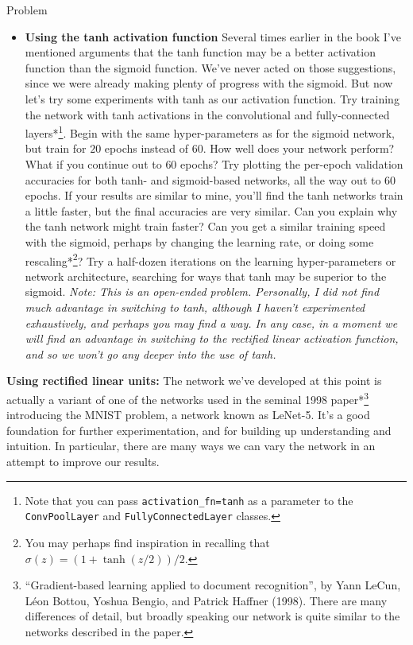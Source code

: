 \begin{exerciseBox}{Problem}


\begin{itemize}

\item \textbf{Using the tanh activation function} Several times earlier in the book I've mentioned arguments that the tanh function may be a better activation function than the sigmoid function. We've never acted on those suggestions, since we were already making plenty of progress with the sigmoid. But now let's try some experiments with tanh as our activation function. Try training the network with tanh activations in the convolutional and fully-connected layers*\footnote{Note that you can pass \texttt{activation\_\allowbreak{}fn=tanh} as a parameter to the \texttt{ConvPoolLayer} and \texttt{FullyConnectedLayer} classes.}. Begin with the same hyper-parameters as for the sigmoid network, but train for $20$ epochs instead of $60$. How well does your network perform? What if you continue out to $60$ epochs? Try plotting the per-epoch validation accuracies for both tanh- and sigmoid-based networks, all the way out to $60$ epochs. If your results are similar to mine, you'll find the tanh networks train a little faster, but the final accuracies are very similar. Can you explain why the tanh network might train faster? Can you get a similar training speed with the sigmoid, perhaps by changing the learning rate, or doing some rescaling*\footnote{You may perhaps find inspiration in recalling that $\sigma(z) = (1+\tanh(z/2))/2$.}? Try a half-dozen iterations on the learning hyper-parameters or network architecture, searching for ways that tanh may be superior to the sigmoid. \emph{Note: This is an open-ended problem. Personally, I did not find much advantage in switching to tanh, although I haven't experimented exhaustively, and perhaps you may find a way. In any case, in a moment we will find an advantage in switching to the rectified linear activation function, and so we won't go any deeper into the use of tanh.}

\end{itemize}


\textbf{Using rectified linear units:} The network we've developed at this point is actually a variant of one of the networks used in the seminal 1998 paper*\footnote{``Gradient-based learning applied to document recognition'', by Yann LeCun, Léon Bottou, Yoshua Bengio, and Patrick Haffner (1998). There are many differences of detail, but broadly speaking our network is quite similar to the networks described in the paper.} introducing the MNIST problem, a network known as LeNet-5. It's a good foundation for further experimentation, and for building up understanding and intuition. In particular, there are many ways we can vary the network in an attempt to improve our results.



\end{exerciseBox}
